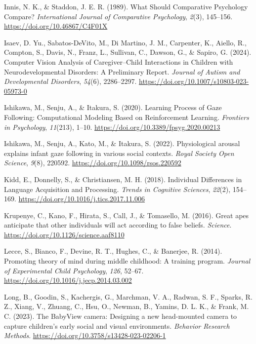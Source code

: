 \documentclass[
]{scrbook}
\newlength{\cslhangindent}
\newenvironment{CSLReferences}[2] %
 {\begin{list}{}{%
  \setlength{\itemindent}{0pt}
  \setlength{\leftmargin}{0pt}
  \setlength{\parsep}{0pt}
  \ifodd #1
   \setlength{\leftmargin}{\cslhangindent}
   \setlength{\itemindent}{-1\cslhangindent}
  \fi
  \setlength{\itemsep}{#2\baselineskip}}}
 {\end{list}}
\begin{document}
\begin{CSLReferences}{1}{0}
Innis, N. K., \& Staddon, J. E. R. (1989). What {Should Comparative Psychology Compare}? \emph{International Journal of Comparative Psychology}, \emph{2}(3), 145--156. \url{https://doi.org/10.46867/C4F01X}

Isaev, D. Yu., Sabatos-DeVito, M., Di Martino, J. M., Carpenter, K., Aiello, R., Compton, S., Davis, N., Franz, L., Sullivan, C., Dawson, G., \& Sapiro, G. (2024). Computer {Vision Analysis} of {Caregiver}--{Child Interactions} in {Children} with {Neurodevelopmental Disorders}: {A Preliminary Report}. \emph{Journal of Autism and Developmental Disorders}, \emph{54}(6), 2286--2297. \url{https://doi.org/10.1007/s10803-023-05973-0}

Ishikawa, M., Senju, A., \& Itakura, S. (2020). Learning {Process} of {Gaze Following}: {Computational Modeling Based} on {Reinforcement Learning}. \emph{Frontiers in Psychology}, \emph{11}(213), 1--10. \url{https://doi.org/10.3389/fpsyg.2020.00213}

Ishikawa, M., Senju, A., Kato, M., \& Itakura, S. (2022). Physiological arousal explains infant gaze following in various social contexts. \emph{Royal Society Open Science}, \emph{9}(8), 220592. \url{https://doi.org/10.1098/rsos.220592}

Kidd, E., Donnelly, S., \& Christiansen, M. H. (2018). Individual {Differences} in {Language Acquisition} and {Processing}. \emph{Trends in Cognitive Sciences}, \emph{22}(2), 154--169. \url{https://doi.org/10.1016/j.tics.2017.11.006}

Krupenye, C., Kano, F., Hirata, S., Call, J., \& Tomasello, M. (2016). Great apes anticipate that other individuals will act according to false beliefs. \emph{Science}. \url{https://doi.org/10.1126/science.aaf8110}

Lecce, S., Bianco, F., Devine, R. T., Hughes, C., \& Banerjee, R. (2014). Promoting theory of mind during middle childhood: {A} training program. \emph{Journal of Experimental Child Psychology}, \emph{126}, 52--67. \url{https://doi.org/10.1016/j.jecp.2014.03.002}

Long, B., Goodin, S., Kachergis, G., Marchman, V. A., Radwan, S. F., Sparks, R. Z., Xiang, V., Zhuang, C., Hsu, O., Newman, B., Yamins, D. L. K., \& Frank, M. C. (2023). The {BabyView} camera: {Designing} a new head-mounted camera to capture children's early social and visual environments. \emph{Behavior Research Methods}. \url{https://doi.org/10.3758/s13428-023-02206-1}


\end{CSLReferences}
\end{document}
